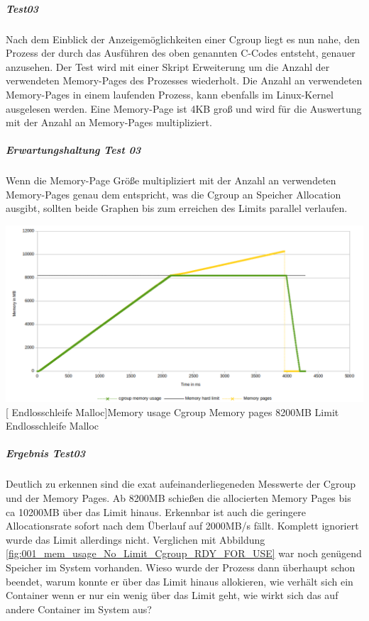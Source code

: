 \subparagraph{Test03}
Nach dem Einblick der Anzeigemöglichkeiten einer Cgroup liegt es nun nahe, den Prozess der durch das Ausführen des oben genannten C-Codes entsteht, genauer anzusehen. Der Test wird mit einer Skript Erweiterung um die Anzahl der verwendeten Memory-Pages des Prozesses wiederholt. Die Anzahl an verwendeten Memory-Pages in einem laufenden Prozess, kann ebenfalls im Linux-Kernel ausgelesen werden. Eine Memory-Page ist 4KB groß und wird für die Auswertung mit der Anzahl an Memory-Pages multipliziert.

\subparagraph{Erwartungshaltung Test 03}
Wenn die Memory-Page Größe multipliziert mit der Anzahl an verwendeten Memory-Pages genau dem entspricht, was die Cgroup an Speicher Allocation ausgibt, sollten beide Graphen bis zum erreichen des Limits parallel verlaufen.

\vspace{1em}
\begin{minipage}{\linewidth}
	\centering
	\includegraphics[width=1\linewidth]{pics/003_mem_usage_8200mb_limit_Cgroup_Pages_RDY_FOR_USE.png}
	[ Endlosschleife Malloc]{Memory usage Cgroup Memory pages 8200MB Limit Endlosschleife Malloc}
	\label{fig:003_mem_usage_8200mb_limit_Cgroup_Pages_RDY_FOR_USE}
\end{minipage}

\subparagraph{Ergebnis Test03}
Deutlich zu erkennen sind die exat aufeinanderliegeneden Messwerte der Cgroup und der Memory Pages. Ab 8200MB schießen die allocierten Memory Pages bis ca 10200MB über das Limit hinaus. Erkennbar ist auch die geringere Allocationsrate sofort nach dem Überlauf auf 2000MB/s fällt. Komplett ignoriert wurde das Limit allerdings nicht. Verglichen mit Abbildung \ref{fig:001_mem_usage_No_Limit_Cgroup_RDY_FOR_USE} war noch genügend Speicher im System vorhanden. Wieso wurde der Prozess dann überhaupt schon beendet, warum konnte er über das Limit hinaus allokieren, wie verhält sich ein Container wenn er nur ein wenig über das Limit geht, wie wirkt sich das auf andere Container im System aus?


